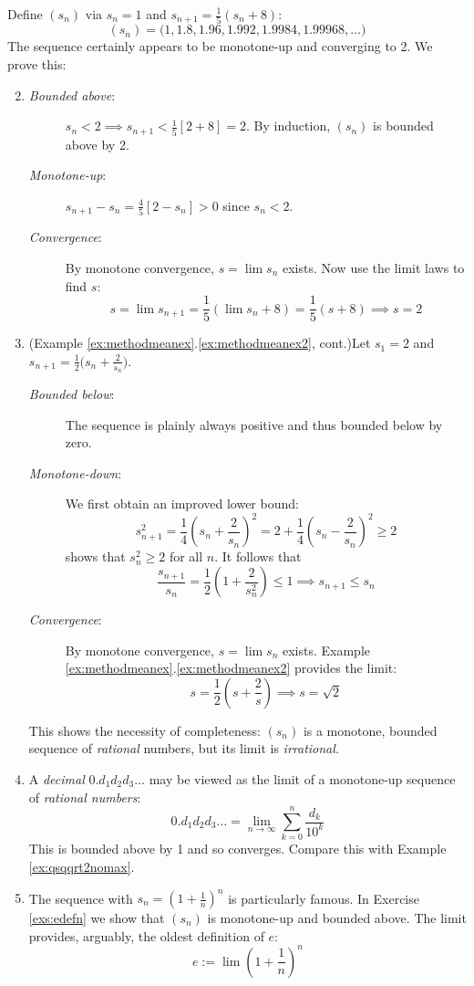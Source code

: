\begin{examples}{}{}
	\exstart Define $(s_n)$ via $s_n=1$ and $s_{n+1}=\frac 15(s_n+8)$:
	\[(s_n)=\bigl(1,1.8,1.96,1.992,1.9984,1.99968,\ldots\bigr)\]
	The sequence certainly appears to be monotone-up and converging to 2. We prove this: 
	\begin{enumerate}\setcounter{enumi}{1}
	  \item[]\begin{description}
    	\item[\normalfont\emph{Bounded above}:] $s_n<2\implies s_{n+1}<\frac 15\left[2+8\right]=2$. By induction, $(s_n)$ is bounded above by 2.
    	\item[\normalfont\emph{Monotone-up}:] $s_{n+1}-s_n=\frac 45\left[2-s_n\right]>0$ since $s_n<2$.  
    	\item[\normalfont\emph{Convergence}:] By monotone convergence, $s=\lim s_n$ exists. Now use the limit laws to find $s$:
  \[s=\lim s_{n+1}=\frac 15\left(\lim s_n+8\right)=\frac 15(s+8)\implies s=2\] 
  	\end{description}
  
  	\item (Example \ref*{ex:methodmeanex}.\ref{ex:methodmeanex2}, cont.)\lstsp Let $s_1=2$ and $s_{n+1}=\frac 12\bigl(s_n+\frac 2{s_n}\bigr)$.
  	\begin{description}
	    \item[\normalfont\emph{Bounded below}:] The sequence is plainly always positive and thus bounded below by zero.
	    \item[\normalfont\emph{Monotone-down}:] We first obtain an improved lower bound:
	    \[s_{n+1}^2=\frac 14\left(s_n+\frac 2{s_n}\right)^2=2+\frac 14\left(s_n-\frac 2{s_n}\right)^2\ge 2\]
	    shows\footnotemark{} that $s_n^2\ge 2$ for all $n$. It follows that
	    \[\frac{s_{n+1}}{s_n}=\frac 12\left(1+\frac 2{s_n^2}\right)\le 1\implies s_{n+1}\le s_n\]
	    \item[\normalfont\emph{Convergence}:] By monotone convergence, $s=\lim s_n$ exists. Example \ref*{ex:methodmeanex}.\ref{ex:methodmeanex2} provides the limit:
	  	\[s=\frac 12\left(s+\frac 2s\right)\implies s=\sqrt 2\] 
  	\end{description}
  	This shows the necessity of completeness: $(s_n)$ is a monotone, bounded sequence of \emph{rational} numbers, but its limit is \emph{irrational.}
  	
  	\item A \emph{decimal} $0.d_1d_2d_3\ldots$ may be viewed as the limit of a monotone-up sequence of \emph{rational numbers}:
  	\[0.d_1d_2d_3\ldots =\lim_{n\to\infty}\sum_{k=0}^n \frac{d_k}{10^k}\]
  	This is bounded above by 1 and so converges. Compare this with Example \ref{ex:qsqqrt2nomax}.
  
    \item The sequence with $s_n=\left(1+\frac 1n\right)^n$ is particularly famous. In Exercise \ref{exs:edefn} we show that $(s_n)$ is monotone-up and bounded above. The limit provides, arguably, the oldest definition of $e$:
  	\[e:=\lim\left(1+\frac 1n\right)^n\]
	\end{enumerate}
\end{examples}

